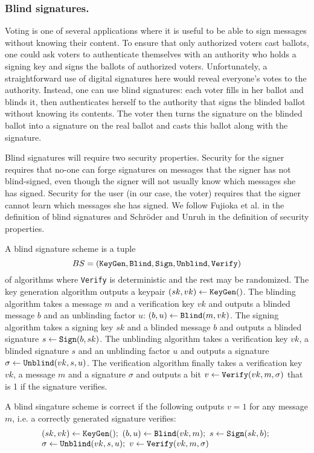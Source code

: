 \documentclass{llncs}
\newcommand{\alg}[1]{\textup{\texttt{#1}}}
\begin{document}
\subsubsection{Blind signatures.}
Voting is one of several applications where it is useful to be able to sign
messages without knowing their content. To ensure that only authorized voters
cast ballots, one could ask voters to authenticate themselves with an authority
who holds a signing key and signs the ballots of authorized voters.
Unfortunately, a straightforward use of digital signatures here would reveal
everyone's votes to the authority. Instead, one can use blind signatures: each
voter fills in her ballot and blinds it, then authenticates herself to the
authority that signs the blinded ballot without knowing its contents. The voter
then turns the signature on the blinded ballot into a signature on the real
ballot and casts this ballot along with the signature.

Blind signatures will require two security properties. Security for the signer
requires that no-one can forge signatures on messages that the signer has not
blind-signed, even though the signer will not usually know which messages she
has signed. Security for the user (in our case, the voter) requires that the
signer cannot learn which messages she has signed. We follow Fujioka et al.
\cite{FOO92} in the definition of blind signatures and Schr\"oder and Unruh
\cite{US11} in the definition of security properties.

\begin{definition}
A blind signature scheme is a tuple
\[
BS = \left( \alg{KeyGen}, \alg{Blind}, \alg{Sign}, \alg{Unblind}, \alg{Verify} \right)
\]
of algorithms where \alg{Verify} is deterministic and the rest may be
randomized. The key generation algorithm outputs a keypair $(sk, vk) \gets
\alg{KeyGen}()$. The blinding algorithm takes a message $m$ and a verification
key $vk$ and outputs a blinded message $b$ and an unblinding factor $u$: $(b, u)
\gets \alg{Blind}(m, vk)$. The signing algorithm takes a signing key $sk$ and a
blinded message $b$ and outputs a blinded signature $s \gets \alg{Sign}(b, sk)$.
The unblinding algorithm takes a verification key $vk$, a blinded signature $s$
and an unblinding factor $u$ and outputs a signature $\sigma \gets
\alg{Unblind}(vk, s, u)$. The verification algorithm finally takes a
verification key $vk$, a message $m$ and a signature $\sigma$ and outputs a bit
$v \gets \alg{Verify}(vk, m, \sigma)$ that is 1 if the signature verifies.

A blind singature scheme is correct if the following outputs $v = 1$ for any
message $m$, i.e. a correctly generated signature verifies:
\[
\begin{array}{l}
(sk, vk) \gets \alg{KeyGen}();\ 
(b, u) \gets \alg{Blind}(vk, m);\ 
s \gets \alg{Sign}(sk, b);\ \\
\sigma \gets \alg{Unblind}(vk, s, u);\ 
v \gets \alg{Verify}(vk, m, \sigma)
\end{array}
\]
\end{definition}
\end{document}
